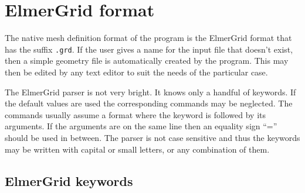 

\chapter{ElmerGrid format}

The native mesh definition format of the program is the ElmerGrid
format that has the suffix \texttt{.grd}. 
If the user gives a name for the input file that doesn't exist, then
a simple geometry file is automatically created by the program.
This may then be edited by any text editor to suit the needs of the particular case.

The ElmerGrid parser is not very bright. It knows only
a handful of keywords. If the default values are 
used the corresponding commands may be neglected. 
The commands usually assume a format where 
the keyword is followed by its arguments. 
If the arguments are on the same line then an equality sign 
``='' should be used in between. 
The parser is not case sensitive and thus the keywords may be written with 
capital or small letters, or any combination of them.


\section{ElmerGrid keywords}


